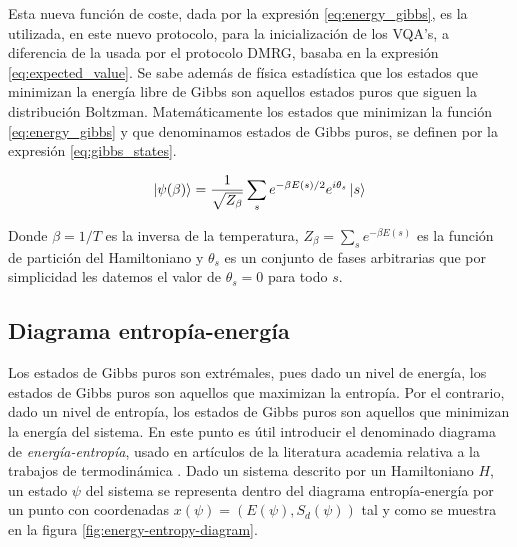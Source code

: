 \newpage

Esta nueva función de coste, dada por la expresión \ref{eq:energy_gibbs}, es la utilizada, en este nuevo protocolo, para la inicialización de los VQA's, a diferencia de la usada por el protocolo DMRG, basaba en la expresión \ref{eq:expected_value}. Se sabe además de física estadística que los estados que minimizan la energía libre de Gibbs son aquellos estados puros que siguen la distribución Boltzman. Matemáticamente los estados que minimizan la función \ref{eq:energy_gibbs} y que denominamos estados de Gibbs puros, se definen por la expresión \ref{eq:gibbs_states}.

\begin{equation}
    \ket{\psi(\beta)}=\frac{1}{\sqrt{Z_\beta}}\sum_s e^{-\beta E(s)/2} e^{i\theta_s}\ket{s}
    \label{eq:gibbs_states}
\end{equation}

Donde $\beta=1/T$ es la inversa de la temperatura, 
$Z_\beta=\sum_{s} e^{-\beta E(s)}$ es la función de partición del Hamiltoniano y
$\theta_s$ es un conjunto de fases arbitrarias que por simplicidad les datemos el valor de $\theta_s=0$ para todo $s$.

\subsection{Diagrama entropía-energía}

Los estados de Gibbs puros son extrémales, pues dado un nivel de energía, los estados de Gibbs puros son aquellos que maximizan la entropía. Por el contrario, dado un nivel de entropía, los estados de Gibbs puros son aquellos que minimizan la energía del sistema. En este punto es útil introducir el denominado diagrama de \textit{energía-entropía}, usado en artículos de la literatura academia relativa a la trabajos de termodinámica \citep{riera}. Dado un sistema descrito por un Hamiltoniano $H$, un estado $\psi$ del sistema se representa dentro del diagrama entropía-energía por un punto con coordenadas $x(\psi) = (E(\psi), S_{d}(\psi))$ tal y como se muestra en la figura \ref{fig:energy-entropy-diagram}.


